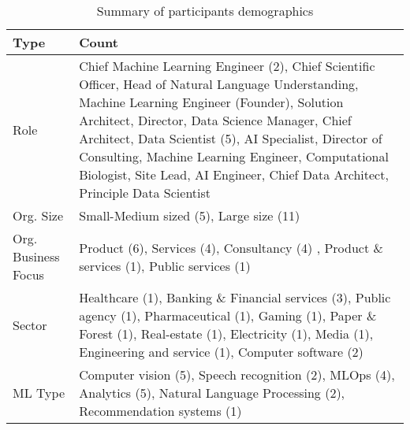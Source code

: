 \begin{table*}[h!]
  \centering
  \caption{Summary of participants demographics}
    \begin{tabular}{lp{12cm} }
    \toprule
    \textbf{Type} & \textbf{Count} \\
    \toprule
    Role & Chief Machine Learning Engineer (2), Chief Scientific Officer, Head of Natural Language Understanding,  Machine Learning Engineer (Founder), Solution Architect, Director, Data Science Manager, Chief Architect, Data Scientist (5), AI Specialist, Director of Consulting, Machine Learning Engineer, Computational Biologist, Site Lead, AI Engineer, Chief Data Architect, Principle Data Scientist \\
    \midrule
    
    Org. Size & Small-Medium sized (5),  Large size (11)\\
    \midrule
    
    Org. Business Focus & Product (6), Services (4), Consultancy (4) , Product \& services (1), Public services (1)\\
    \midrule
    
    Sector & Healthcare (1), Banking \& Financial services (3), Public agency (1), Pharmaceutical (1), Gaming (1), Paper \& Forest (1), Real-estate (1), Electricity (1), Media (1), Engineering and service (1), Computer software (2)\\
    \midrule
    
    ML Type & Computer vision (5), Speech recognition (2), MLOps (4), Analytics (5), Natural Language Processing (2), Recommendation systems (1)\\
    \bottomrule
    
    \end{tabular}%
  \label{tab:practioners}%
\end{table*}%



